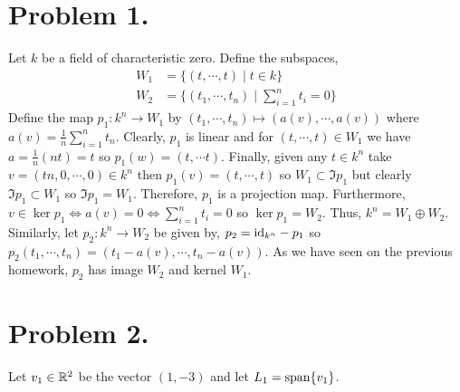 \documentclass[12pt]{extarticle}
\begin{document}

\section*{Problem 1.}

Let $k$ be a field of characteristic zero. Define the subspaces,
\begin{align*}
W_1 & = \{(t, \cdots, t) \mid t \in k \} \\
W_2 & = \{(t_1, \cdots, t_n) \mid \sum_{i = 1}^n t_i = 0\}
\end{align*}
Define the map $p_1 : k^n \to W_1$ by $(t_1, \cdots, t_n) \mapsto (a(v), \cdots, a(v))$ where $a(v) = \frac{1}{n} \sum_{i = 1}^n t_n$. Clearly, $p_1$ is linear and for $(t, \cdots, t) \in W_1$ we have $a = \frac{1}{n} (nt) = t$ so $p_1(w) = (t, \cdots t)$. Finally, given any $t \in k^n$ take $v = (tn, 0, \cdots, 0) \in k^n$ then $p_1(v) = (t, \cdots, t)$ so $W_1 \subset \Im{p_1}$ but clearly $\Im{p_1} \subset W_1$ so $\Im{p_1} = W_1$. Therefore, $p_1$ is a projection map. Furthermore, $v \in \ker{p_1} \iff a(v) = 0 \iff \sum_{i = 1}^n t_i = 0$ so $\ker{p_1} = W_2$. Thus, $k^n = W_1 \oplus W_2$. \bigskip \\
Similarly, let $p_2 : k^n \to W_2$ be given by, $p_2 = \mathrm{id}_{k^n} - p_1$ so $p_2(t_1, \cdots, t_n) = (t_1 - a(v), \cdots, t_n - a(v))$. As we have seen on the previous homework, $p_2$ has image $W_2$ and kernel $W_1$. 

\section*{Problem 2.}

Let $v_1 \in \mathbb{R}^2$ be the vector $(1, -3)$ and let $L_1 = \mathrm{span}\! \left\{v_1 \right\}$.
\end{document}
